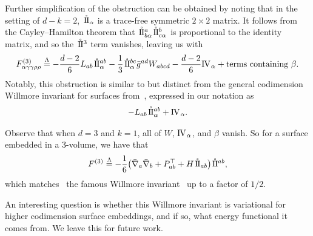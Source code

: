 \documentclass[pdftex]{sigma}
\numberwithin{equation}{section}
\newcommand{\IIo}{\hspace{0.4mm}\mathring{\rm{ I\hspace{-.2mm} I}}{\hspace{.0mm}}}
\newcommand{\IVnn}{{{\bf\rm I\hspace{-.2mm} V}{\hspace{.2mm}}}{}}
\renewcommand{\=}{\stackrel \Lambda =}
\begin{document}
Further simplification of the obstruction can be obtained by noting that in the setting of $d-k=2$, $\IIo_{\alpha}$ is a trace-free symmetric $2\times 2$
matrix. It follows from the Cayley--Hamilton theorem that $\IIo^a_{b \alpha} \IIo^b_{c \alpha}$ is proportional to the identity matrix, and so the $\IIo^3$ term vanishes, leaving us with
\begin{align} \label{surface-willmore}
F^{(3)}_{\alpha \gamma \gamma \rho \rho} \= -\frac{d-2}{6} L_{ab} \IIo^{ab}_{\alpha} - \frac{1}{3} \IIo^{bc}_{\alpha} \bar{g}^{ad} W_{abcd} - \frac{d-2}{6} \IVnn_{\alpha} + \text{terms containing } \beta .
\end{align}
Notably, this obstruction is similar to but distinct from the general codimension Willmore invariant for surfaces from~\cite{CGKTW}, expressed in our notation as
\begin{align*}
-L_{ab} \IIo^{ab}_{\alpha} + \IVnn_{\alpha} .
\end{align*}

Observe that when $d=3$ and $k=1$, all of $W$, $\IVnn_{\alpha}$, and $\beta$ vanish.
So for a surface embedded in a 3-volume, we have that
\[F^{(3)} \= -\frac{1}{6} \bigl(\bar{\nabla}_a \bar{\nabla}_b + P^\top_{ab} + H \IIo_{ab} \bigr) \IIo^{ab} ,\]
which matches~\cite{hypersurface_old} the famous Willmore invariant~\cite{willmore1965} up to a factor of $1/2$.

\begin{Remark}
An interesting question is whether this Willmore invariant is variational for higher codimension surface embeddings, and if so, what energy functional it comes from. We leave this for future work.
\end{Remark}
\end{document}
